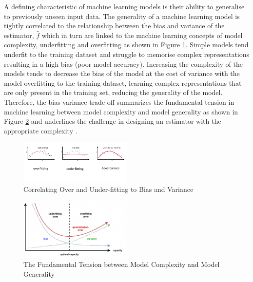 \documentclass[../SMLreport_template.tex]{subfiles}
\begin{document}
A defining characteristic of machine learning models is their ability to generalise to previously unseen input data. The generality of a machine learning model is tightly correlated to the relationship between the bias and variance of the estimator, \(\hat{f}\) which in turn are linked to the machine learning concepts of model complexity, underfitting and overfitting as shown in Figure \ref{bias_var}. Simple models tend underfit to the training dataset and struggle to memorise complex representations resulting in a high bias (poor model accuracy). Increasing the complexity of the models tends to decrease the bias of the model at the cost of variance with the model overfitting to the training dataset, learning complex representations that are only present in the training set, reducing the generality of the model. Therefore, the bias-variance trade off summarizes the fundamental tension in machine learning between model complexity and model generality as shown in Figure \ref{cap} and underlines the challenge in designing an estimator with the appropriate complexity \cite{goodfellow-bengio-courville}\cite{mehta-wang-Day-Richardson}. 

\begin{figure}[t]
    \centering
    \includegraphics[width=0.5\textwidth]{images/model_fitting.png}
    \caption{Correlating Over and Under-fitting to Bias and Variance}
    \label{bias_var}
\end{figure}
\newpage

\begin{figure}[t]
    \centering
    \includegraphics[width=0.5\textwidth]{images/capacity.png}
    \caption{The Fundamental Tension between Model Complexity and Model Generality}
    \label{cap}
\end{figure}
\end{document}

